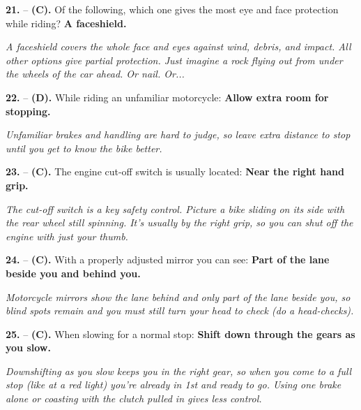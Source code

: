 \begin{minipage}{\linewidth}
\noindent\textbf{21.}  -- \textbf {(C).} Of the following, which one gives the most eye and face protection while riding?  \textbf {A faceshield.} \par \textit {A faceshield covers the whole face and eyes against wind, debris, and impact. All other options give partial protection. Just imagine a rock flying out from under the wheels of the car ahead. Or nail. Or...} \\
\end{minipage}

\begin{minipage}{\linewidth}
\noindent\textbf{22.}  -- \textbf {(D).} While riding an unfamiliar motorcycle:  \textbf {Allow extra room for stopping.} \par \textit {Unfamiliar brakes and handling are hard to judge, so leave extra distance to stop until you get to know the bike better.} \\
\end{minipage}

\begin{minipage}{\linewidth}
\noindent\textbf{23.}  -- \textbf {(C).} The engine cut-off switch is usually located:  \textbf {Near the right hand grip.} \par \textit {The cut-off switch is a key safety control. Picture a bike sliding on its side with the rear wheel still spinning. It's usually by the right grip, so you can shut off the engine with just your thumb.} \\
\end{minipage}

\begin{minipage}{\linewidth}
\noindent\textbf{24.}  -- \textbf {(C).} With a properly adjusted mirror you can see:  \textbf {Part of the lane beside you and behind you.} \par \textit {Motorcycle mirrors show the lane behind and only part of the lane beside you, so blind spots remain and you must still turn your head to check (do a head-checks).} \\
\end{minipage}

\begin{minipage}{\linewidth}
\noindent\textbf{25.}  -- \textbf {(C).} When slowing for a normal stop:  \textbf {Shift down through the gears as you slow.} \par \textit {Downshifting as you slow keeps you in the right gear, so when you come to a full stop (like at a red light) you're already in 1st and ready to go. Using one brake alone or coasting with the clutch pulled in gives less control.} \\
\end{minipage}

